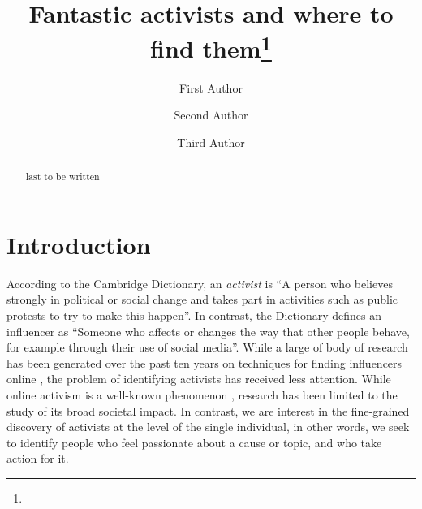 \documentclass[runningheads]{llncs}
\begin{document}
%
\title{Fantastic activists and where to find them\thanks{}}
%
%
\author{First Author \and
Second Author \and
Third Author}
%
%
%
\maketitle              %
%
\begin{abstract}
last to be written
\end{abstract}
%


%
%
\section{Introduction}


According to the Cambridge Dictionary, an \textit{activist} is  ``A person who believes strongly in political or social change and takes part in activities such as public protests to try to make this happen''.
In contrast, the Dictionary defines an influencer as ``Someone who affects or changes the way that other people behave, for example through their use of social media''.
%
While a large of body of research has been generated over the past ten years on techniques for finding influencers online \cite{RIQUELME2016949}, the problem of identifying activists has received less attention. 
While online activism is a well-known phenomenon \cite{IJoC1246}, research has been limited to the study of its broad societal impact. 
In contrast, we are interest in the fine-grained discovery of activists at the level of the single individual, in other words, we seek to identify people who feel passionate about a cause or topic, and who take action for it.
\end{document}
